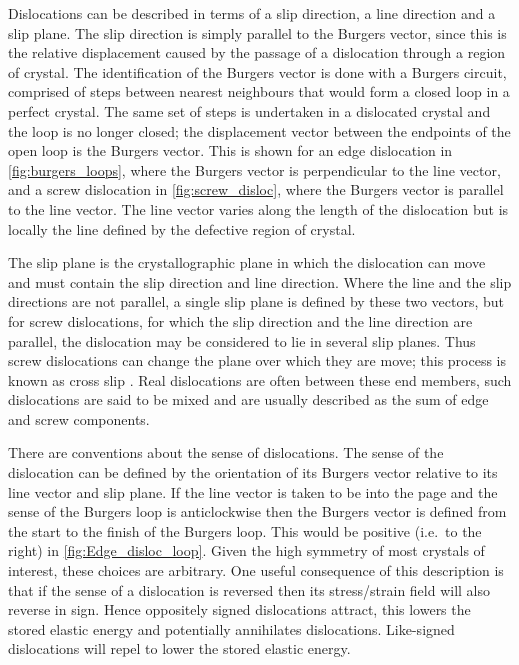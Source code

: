 Dislocations can be described in terms of a slip direction, a line direction and a slip plane. The slip direction is simply parallel to the Burgers vector, since this is the relative displacement caused by the passage of a dislocation through a region of crystal. The identification of the Burgers vector is done with a Burgers circuit, comprised of steps between nearest neighbours that would form a closed loop in a perfect crystal. The same set of steps is undertaken in a dislocated crystal and the loop is no longer closed; the displacement vector between the endpoints of the open loop is the Burgers vector. This is shown for an edge dislocation in \autoref{fig:burgers_loops}, where the Burgers vector is perpendicular to the line vector, and a screw dislocation in \autoref{fig:screw_disloc}, where the Burgers vector is parallel to the line vector. The line vector varies along the length of the dislocation but is locally the line defined by the defective region of crystal. 

The slip plane is the crystallographic plane in which the dislocation can move and must contain the slip direction and line direction. Where the line and the slip directions are not parallel, a single slip plane is defined by these two vectors, but for screw dislocations, for which the slip direction and the line direction are parallel, the dislocation may be considered to lie in several slip planes. Thus screw dislocations can change the plane over which they are move; this process is known as cross slip \cite{Hirth_Lothe1982intro}. Real dislocations are often between these end members, such dislocations are said to be mixed and are usually described as the sum of edge and screw components.

There are conventions about the sense of dislocations. The sense of the dislocation can be defined by the orientation of its Burgers vector relative to its line vector and slip plane. If the line vector is taken to be into the page and the sense of the Burgers loop is anticlockwise then the Burgers vector is defined from the start to the finish of the Burgers loop. This would be positive (i.e.\ to the right) in \autoref{fig:Edge_disloc_loop}. Given the high symmetry of most crystals of interest, these choices are arbitrary. One useful consequence of this description is that if the sense of a dislocation is reversed then its stress/strain field will also reverse in sign. Hence oppositely signed dislocations attract, this lowers the stored elastic energy and potentially annihilates dislocations. Like-signed dislocations will repel to lower the  stored elastic energy.



